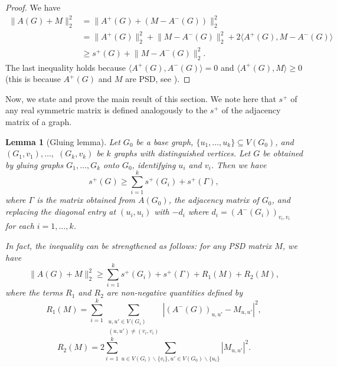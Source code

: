 \documentclass{article}
\newtheorem{lemma}{Lemma}[section]
\newcommand{\abs}[1]{|#1|}
\newcommand{\norm}[1]{\lVert#1\rVert}
\begin{document}
\begin{proof}
  We have
\begin{align*}
\norm{A(G) + M}_2^2 & = \norm{A^+(G) + (M-A^-(G))}_2^2 \\
& = \norm{A^+(G)}_2^2 + \norm{M-A^-(G)}_2^2 + 2\langle A^+(G), M-A^-(G) \rangle\\
& \ge s^+(G) + \norm{M-A^-(G)}_2^2.
\end{align*}
The last inequality holds because $\langle A^+(G), A^-(G)\rangle =0$ and $\langle A^+(G), M\rangle \ge 0$ (this is because $A^+(G)$ and $M$ are PSD, see \cite[Theorem 7.5]{F_Zhang_Matrix_Theory_2011}).
\end{proof}

Now, we state and prove the main result of this section. We note here that $s^+$ of any real symmetric matrix is defined analogously to the $s^+$ of the adjacency matrix of a graph.

\begin{lemma}[Gluing lemma]\label{lem:gluing}
Let $G_0$ be a base graph, $\{u_1, \ldots, u_k\} \subseteq V(G_0)$, and $(G_1, v_1),\ldots,$ $(G_k, v_k)$ be $k$ graphs with distinguished vertices. Let $G$ be obtained by gluing graphs $G_1, \ldots, G_k$ onto $G_0$, identifying $u_i$ and $v_i$. Then we have
    $$s^+(G) \geq  \sum_{i = 1}^k s^+(G_i) + s^+(\Gamma),$$
where $\Gamma$ is the matrix obtained from $A(G_0)$, the adjacency matrix of $G_0$, and replacing the diagonal entry at $(u_i, u_i)$ with $-d_i$ where $d_i = (A^-(G_i))_{v_i, v_i}$ for each $i = 1,\dots, k$. 
    
In fact, the inequality can be strengthened as follows: for any PSD matrix $M$, we have
\[\norm{A(G) + M}_2^2\geq \sum_{i = 1}^k s^+(G_i) + s^+(\Gamma) + R_1(M) + R_2(M),\] 
where the terms $R_1$ and $R_2$ are non-negative quantities defined by
    $$R_1(M) = \sum_{i = 1}^k \sum_{\substack{u, u' \in V(G_i) \\ (u, u') \neq (v_i, v_i)}} \abs{(A^-(G))_{u, u'} - M_{u, u'}}^2,$$
    $$R_2(M) = 2 \sum_{i = 1}^k \sum_{u \in V(G_i) \backslash \{v_i\}, u' \in V(G_0) \backslash \{u_i\}} \abs{M_{u, u'}}^2.$$   
\end{lemma}
\end{document}
